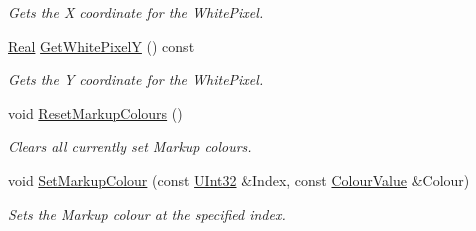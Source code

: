 \begin{DoxyCompactItemize}
\begin{DoxyCompactList}\small\item\em Gets the X coordinate for the WhitePixel. \item\end{DoxyCompactList}\item 
\hyperlink{namespaceMezzanine_a726731b1a7df72bf3583e4a97282c6f6}{Real} \hyperlink{classMezzanine_1_1UI_1_1TextureAtlas_a9d07546d9127423ee36a50256ae5a6a9}{GetWhitePixelY} () const 
\begin{DoxyCompactList}\small\item\em Gets the Y coordinate for the WhitePixel. \item\end{DoxyCompactList}\item 
\hypertarget{classMezzanine_1_1UI_1_1TextureAtlas_aac5307a939f098e1433f20847ade9a58}{
void \hyperlink{classMezzanine_1_1UI_1_1TextureAtlas_aac5307a939f098e1433f20847ade9a58}{ResetMarkupColours} ()}
\label{classMezzanine_1_1UI_1_1TextureAtlas_aac5307a939f098e1433f20847ade9a58}

\begin{DoxyCompactList}\small\item\em Clears all currently set Markup colours. \item\end{DoxyCompactList}\item 
void \hyperlink{classMezzanine_1_1UI_1_1TextureAtlas_adc3dbdf25180cbd25c0f0a3edd935cea}{SetMarkupColour} (const \hyperlink{namespaceMezzanine_abea3b8e8e9b03d2547b2800284ba682d}{UInt32} \&Index, const \hyperlink{classMezzanine_1_1ColourValue}{ColourValue} \&Colour)
\begin{DoxyCompactList}\small\item\em Sets the Markup colour at the specified index. \item\end{DoxyCompactList}\end{DoxyCompactItemize}
